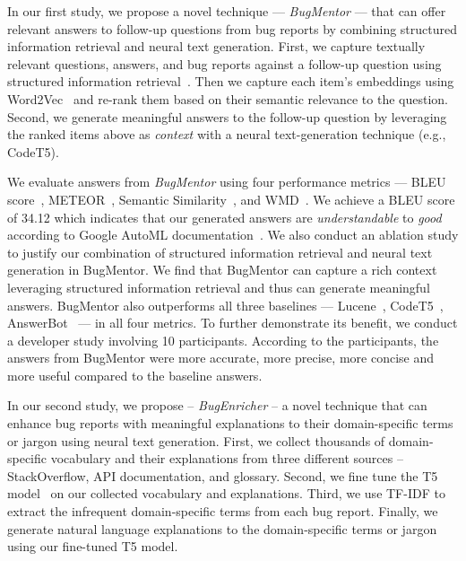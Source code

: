 In our first study, we propose a novel technique --- \textit{BugMentor} --- that can offer relevant answers to follow-up questions from bug reports by combining structured information retrieval and neural text generation. First, we capture textually relevant questions, answers, and bug reports against a follow-up question using structured information retrieval~\cite{saha2013improving}. Then we capture each item's embeddings using Word2Vec~\cite{efstathiou2018word} and re-rank them based on their semantic relevance to the question. Second, we generate meaningful answers to the follow-up question by leveraging the ranked items above as \textit{context} with a neural text-generation technique (e.g., CodeT5).

We evaluate answers from \textit{BugMentor} using four performance metrics ---  BLEU score~\cite{papineni2002bleu}, METEOR~\cite{banerjee2005meteor}, Semantic Similarity~\cite{haque2022semantic}, and WMD~\cite{huang2016supervised}. We achieve a BLEU score of 34.12 which indicates that our generated answers are \textit{understandable} to \textit{good} according to Google AutoML documentation~\cite{automldoc}. We also conduct an ablation study to justify our combination of structured information retrieval and neural text generation in BugMentor. We find that BugMentor can capture a rich context leveraging structured information retrieval and thus can generate meaningful answers. BugMentor also outperforms all three baselines --- Lucene~\cite{mccandless2010lucene}, CodeT5~\cite{wang2021codet5}, AnswerBot~\cite{xu2017answerbot} --- in all four metrics.  To further demonstrate its benefit, we conduct a developer study involving 10 participants. According to the participants, the answers from BugMentor were more accurate, more precise, more concise and more useful compared to the baseline answers.


In our second study, we propose -- \textit{BugEnricher} -- a novel technique that can enhance bug reports with meaningful explanations to their domain-specific terms or jargon using neural text generation. First, we collect thousands of domain-specific vocabulary and their explanations from three different sources -- StackOverflow, API documentation, and glossary. Second, we fine tune the T5 model~\cite{raffel2020exploring} on our collected vocabulary and explanations. Third, we use \acrshort{TF-IDF} to extract the infrequent domain-specific terms from each bug report. Finally, we generate natural language explanations to the domain-specific terms or jargon using our fine-tuned T5 model. \par

